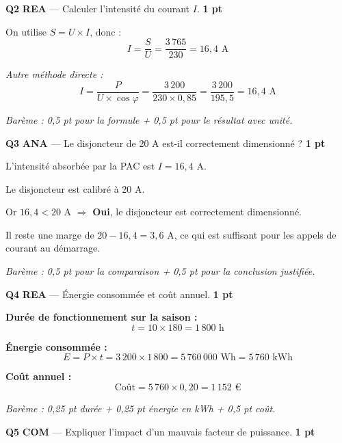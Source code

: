 \documentclass[a4paper,11pt]{article}
\newcommand{\pts}[1]{\hfill\textcolor{gris}{\small\textbf{#1}}}
\newcommand{\comp}[1]{\colorbox{blue!10}{\scriptsize\textbf{#1}}}
\begin{document}
\textbf{Q2} \comp{REA} — Calculer l'intensité du courant $I$. \pts{1 pt}

\begin{corrbox}
On utilise $S = U \times I$, donc :
\[
I = \frac{S}{U} = \frac{3\,765}{230} = \boxed{16{,}4 \text{ A}}
\]

\textit{Autre méthode directe :}
\[
I = \frac{P}{U \times \cos\varphi} = \frac{3\,200}{230 \times 0{,}85} = \frac{3\,200}{195{,}5} = 16{,}4 \text{ A}
\]

\textit{Barème : 0,5 pt pour la formule + 0,5 pt pour le résultat avec unité.}
\end{corrbox}

\textbf{Q3} \comp{ANA} — Le disjoncteur de 20 A est-il correctement dimensionné ? \pts{1 pt}

\begin{corrbox}
L'intensité absorbée par la PAC est $I = 16{,}4$ A.

Le disjoncteur est calibré à 20 A.

Or $16{,}4 < 20$ A $\Rightarrow$ \textbf{Oui}, le disjoncteur est correctement dimensionné.

Il reste une marge de $20 - 16{,}4 = 3{,}6$ A, ce qui est suffisant pour les appels de courant au démarrage.

\smallskip
\textit{Barème : 0,5 pt pour la comparaison + 0,5 pt pour la conclusion justifiée.}
\end{corrbox}

\textbf{Q4} \comp{REA} — Énergie consommée et coût annuel. \pts{1 pt}

\begin{corrbox}
\textbf{Durée de fonctionnement sur la saison :}
\[
t = 10 \times 180 = 1\,800 \text{ h}
\]

\textbf{Énergie consommée :}
\[
E = P \times t = 3\,200 \times 1\,800 = 5\,760\,000 \text{ Wh} = \boxed{5\,760 \text{ kWh}}
\]

\textbf{Coût annuel :}
\[
\text{Coût} = 5\,760 \times 0{,}20 = \boxed{1\,152 \text{ €}}
\]

\textit{Barème : 0,25 pt durée + 0,25 pt énergie en kWh + 0,5 pt coût.}
\end{corrbox}

\textbf{Q5} \comp{COM} — Expliquer l'impact d'un mauvais facteur de puissance. \pts{1 pt}
\end{document}
